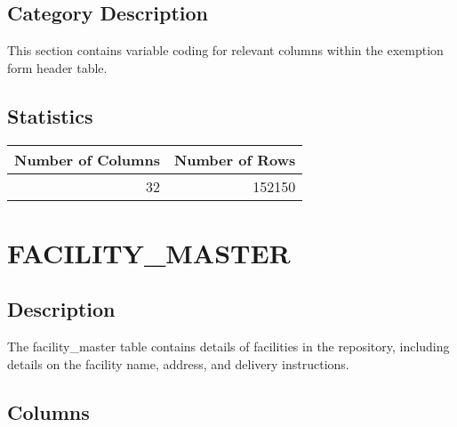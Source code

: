 \documentclass[
  letterpaper,
  DIV=11,
  numbers=noendperiod]{scrreprt}
\begin{document}
\hypertarget{category-description-9}{%
\section*{Category Description}\label{category-description-9}}

This section contains variable coding for relevant columns within the
exemption form header table.

\hypertarget{statistics-9}{%
\section*{Statistics}\label{statistics-9}}

\begin{longtable}{rr}
\toprule
Number of Columns & Number of Rows \\ 
\midrule
32 & 152150 \\ 
\bottomrule
\end{longtable}

\hypertarget{facility_master}{%
\chapter*{FACILITY\_MASTER}\label{facility_master}}

\hypertarget{description-10}{%
\section*{Description}\label{description-10}}

The facility\_master table contains details of facilities in the
repository, including details on the facility name, address, and
delivery instructions.

\hypertarget{columns-10}{%
\section*{Columns}\label{columns-10}}
\end{document}

